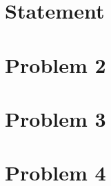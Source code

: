 \documentclass{article}
\numberwithin{equation}{section} %
\numberwithin{figure}{section} %
\begin{document}

\section{Statement}  %
\newpage \section{Problem 2}  %
\newpage \section{Problem 3}  %
\newpage \section{Problem 4}  %
\end{document}
